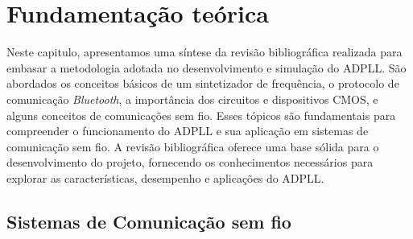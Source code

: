 \chapter{Fundamentação teórica}
Neste capitulo, apresentamos uma síntese da revisão bibliográfica realizada para embasar a metodologia adotada no desenvolvimento e simulação do ADPLL. São abordados os conceitos básicos de um sintetizador de frequência, o protocolo de comunicação \textit{Bluetooth}, a importância dos circuitos e dispositivos CMOS, e alguns conceitos de comunicações sem fio. Esses tópicos são fundamentais para compreender o funcionamento do ADPLL e sua aplicação em sistemas de comunicação sem fio. A revisão bibliográfica oferece uma base sólida para o desenvolvimento do projeto, fornecendo os conhecimentos necessários para explorar as características, desempenho e aplicações do ADPLL.


\section{Sistemas de Comunicação sem fio}
%
%
%


